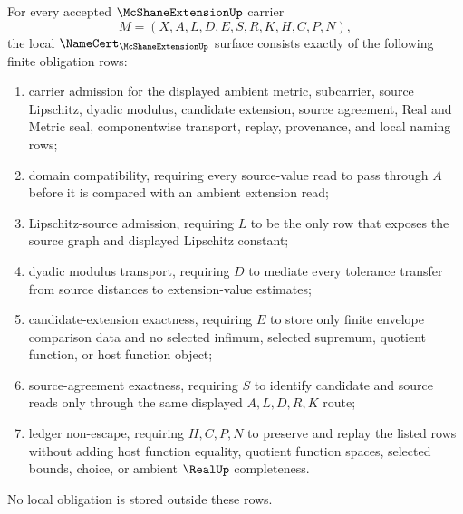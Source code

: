 \begin{theorem}
\label{thm:mcshane-extension-namecert-obligations}
For every accepted $\McShaneExtensionUp$ carrier
$$
M=(X,A,L,D,E,S,R,K,H,C,P,N),
$$
the local $\NameCert_{\McShaneExtensionUp}$ surface consists exactly of the following finite obligation rows:
\begin{enumerate}
\item carrier admission for the displayed ambient metric, subcarrier, source Lipschitz, dyadic modulus, candidate extension, source agreement, Real and Metric seal, componentwise transport, replay, provenance, and local naming rows;
\item domain compatibility, requiring every source-value read to pass through $A$ before it is compared with an ambient extension read;
\item Lipschitz-source admission, requiring $L$ to be the only row that exposes the source graph and displayed Lipschitz constant;
\item dyadic modulus transport, requiring $D$ to mediate every tolerance transfer from source distances to extension-value estimates;
\item candidate-extension exactness, requiring $E$ to store only finite envelope comparison data and no selected infimum, selected supremum, quotient function, or host function object;
\item source-agreement exactness, requiring $S$ to identify candidate and source reads only through the same displayed $A,L,D,R,K$ route;
\item ledger non-escape, requiring $H,C,P,N$ to preserve and replay the listed rows without adding host function equality, quotient function spaces, selected bounds, choice, or ambient $\RealUp$ completeness.
\end{enumerate}
No local obligation is stored outside these rows.
\end{theorem}
